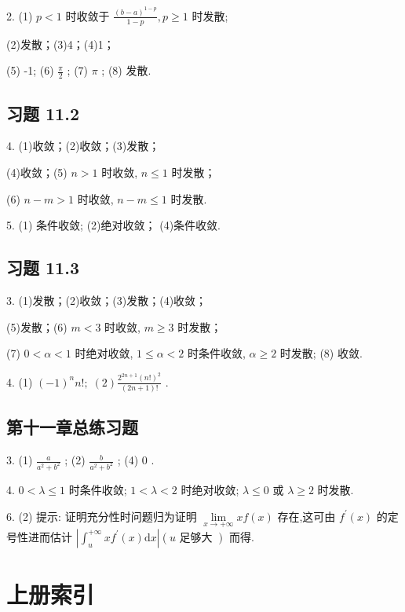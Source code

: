 2. (1) \(p < 1\) 时收敛于 \(\frac{{\left( b - a\right) }^{1 - p}}{1 - p},p \geq  1\) 时发散;

(2)发散；(3)4；(4)1；

(5) -1; (6) \(\frac{\pi }{2}\) ; (7) \(\pi\) ; (8) 发散.

\subsection{习题 11.2}

4. (1)收敛；(2)收敛；(3)发散；

(4)收敛；(5) \(n > 1\) 时收敛, \(n \leq  1\) 时发散；

(6) \(n - m > 1\) 时收敛, \(n - m \leq  1\) 时发散.

5. (1) 条件收敛; (2)绝对收敛； (4)条件收敛.

\subsection{习题 11.3}

3. (1)发散；(2)收敛；(3)发散；(4)收敛；

(5)发散；(6) \(m < 3\) 时收敛, \(m \geq  3\) 时发散；

(7) \(0 < \alpha  < 1\) 时绝对收敛, \(1 \leq  \alpha  < 2\) 时条件收敛, \(\alpha  \geq  2\) 时发散; (8) 收敛.

4. (1) \({\left( -1\right) }^{n}n!;\;\left( 2\right) \frac{{2}^{{2n} + 1}{\left( n!\right) }^{2}}{\left( {{2n} + 1}\right) !}\) .

\subsection{第十一章总练习题}

3. (1) \(\frac{a}{{a}^{2} + {b}^{2}}\) ; (2) \(\frac{b}{{a}^{2} + {b}^{2}}\) ; (4) 0 .

4. \(0 < \lambda  \leq  1\) 时条件收敛; \(1 < \lambda  < 2\) 时绝对收敛; \(\lambda  \leq  0\) 或 \(\lambda  \geq  2\) 时发散.

6. (2) 提示: 证明充分性时问题归为证明 \(\mathop{\lim }\limits_{{x \rightarrow   + \infty }}{xf}\left( x\right)\) 存在,这可由 \({f}^{\prime }\left( x\right)\) 的定号性进而估计 \(\left| {{\int }_{u}^{+\infty }x{f}^{\prime }\left( x\right) \mathrm{d}x}\right| \left( {u\text{ 足够大 }}\right)\) 而得.

\section{上册索引}

